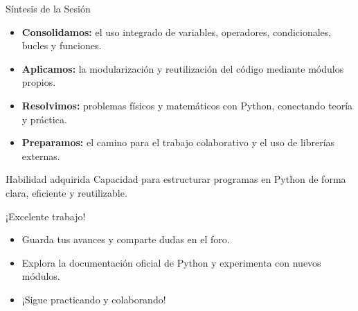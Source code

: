 \documentclass[10pt]{beamer}
\begin{document}
\begin{frame}{Síntesis de la Sesión}
  \begin{itemize}
    \item \textbf{Consolidamos:} el uso integrado de variables, operadores, condicionales, bucles y funciones.
    \item \textbf{Aplicamos:} la modularización y reutilización del código mediante módulos propios.
    \item \textbf{Resolvimos:} problemas físicos y matemáticos con Python, conectando teoría y práctica.
    \item \textbf{Preparamos:} el camino para el trabajo colaborativo y el uso de librerías externas.
  \end{itemize}
  \begin{block}{Habilidad adquirida}
    Capacidad para estructurar programas en Python de forma clara, eficiente y reutilizable.
  \end{block}
\end{frame}


\begin{frame}
  \huge{\centerline{¡Excelente trabajo!}}
  \vspace{0.5cm}
  \normalsize
  \begin{itemize}
    \item Guarda tus avances y comparte dudas en el foro.
    \item Explora la documentación oficial de Python y experimenta con nuevos módulos.
    \item ¡Sigue practicando y colaborando!
  \end{itemize}
\end{frame}
\end{document}

